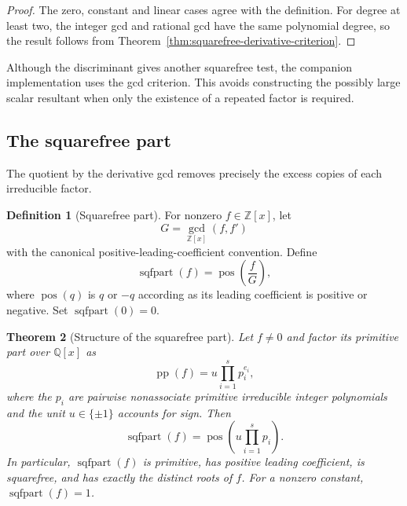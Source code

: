 \documentclass[11pt]{book}
\newtheorem{theorem}{Theorem}[section]
\theoremstyle{definition}
\newtheorem{definition}[theorem]{Definition}
\newcommand{\ZZ}{\mathbb Z}
\begin{document}
\begin{proof}
The zero, constant and linear cases agree with the definition.  For degree at
least two, the integer gcd and rational gcd have the same polynomial degree,
so the result follows from Theorem~\ref{thm:squarefree-derivative-criterion}.
\end{proof}

Although the discriminant gives another squarefree test, the companion
implementation uses the gcd criterion.  This avoids constructing the possibly
large scalar resultant when only the existence of a repeated factor is
required.

\subsection{The squarefree part}

The quotient by the derivative gcd removes precisely the excess copies of
each irreducible factor.

\begin{definition}[Squarefree part]\label{def:squarefree-part}
For nonzero $f\in\ZZ[x]$, let
\[
 G=\gcd_{\ZZ[x]}(f,f')
\]
with the canonical positive-leading-coefficient convention.  Define
\begin{equation}\label{eq:squarefree-part}
 \operatorname{sqfpart}(f)
 =\operatorname{pos}\!\left(\frac{f}{G}\right),
\end{equation}
where $\operatorname{pos}(q)$ is $q$ or $-q$ according as its leading
coefficient is positive or negative.  Set
$\operatorname{sqfpart}(0)=0$.
\end{definition}

\begin{theorem}[Structure of the squarefree part]
\label{thm:squarefree-part-structure}
Let $f\ne0$ and factor its primitive part over $\mathbb Q[x]$ as
\[
 \operatorname{pp}(f)=u\prod_{i=1}^s p_i^{e_i},
\]
where the $p_i$ are pairwise nonassociate primitive irreducible integer
polynomials and the unit $u\in\{\pm1\}$ accounts for sign.  Then
\begin{equation}\label{eq:squarefree-part-factorization}
 \operatorname{sqfpart}(f)
 =\operatorname{pos}\!\left(u\prod_{i=1}^s p_i\right).
\end{equation}
In particular, $\operatorname{sqfpart}(f)$ is primitive, has positive leading
coefficient, is squarefree, and has exactly the distinct roots of $f$.
For a nonzero constant, $\operatorname{sqfpart}(f)=1$.
\end{theorem}
\end{document}
